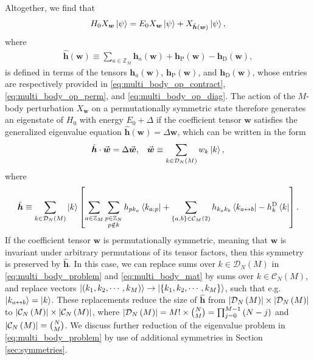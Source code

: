 \documentclass[nofootinbib,notitlepage,11pt]{revtex4-2}
\renewcommand{\t}{\text} %
\newcommand{\p}[1]{\left(#1\right)} %
\renewcommand{\sp}[1]{\left[#1\right]} %
\renewcommand{\set}[1]{\left\{#1\right\}} %
\renewcommand{\c}{\cdot} %
\newcommand{\m}{\bm} %
\renewcommand{\v}{\vec} %
\newcommand{\1}{\mathds{1}}
\newcommand{\C}{\mathcal{C}}
\newcommand{\D}{\mathcal{D}}
\newcommand{\ZZ}{\mathbb{Z}}
\newcommand{\lra}{\leftrightarrow}
\begin{document}
Altogether, we find that
\begin{align}
  H_0 X_{\m w} \ket\psi
  = E_0 X_{\m w} \ket\psi + X_{\hat{\m h}\p{\m w}} \ket\psi,
\end{align}
where
\begin{align}
  \hat{\m h}\p{\m w}
  \equiv \sum_{a\in\ZZ_M} \m h_a\p{\m w}
  + \m h_{\t{P}}\p{\m w} - \m h_{\t{D}}\p{\m w},
\end{align}
is defined in terms of the tensors $\m h_a\p{\m w}$,
$\m h_{\t{P}}\p{\m w}$, and $\m h_{\t{D}}\p{\m w}$, whose entries are
respectively provided in \eqref{eq:multi_body_op_contract},
\eqref{eq:multi_body_op_perm}, and \eqref{eq:multi_body_op_diag}.  The
action of the $M$-body perturbation $X_{\m w}$ on a permutationally
symmetric state therefore generates an eigenstate of $H_0$ with energy
$E_0+\Delta$ if the coefficient tensor $\m w$ satisfies the
generalized eigenvalue equation $\hat{\m h}\p{\m w} = \Delta \m w$,
which can be written in the form
\begin{align}
  \hat{\m h} \c \v{\m w} = \Delta \v{\m w},
  &&
  \v{\m w} \equiv \sum_{k\in\D_N\p{M}} w_k \ket{k},
  \label{eq:multi_body_problem}
\end{align}
where
\begin{align}
  \hat{\m h} \equiv \sum_{k\in\D_N\p{M}} \ket{k}
  \sp{\sum_{a\in\ZZ_M} \sum_{\substack{p\in\ZZ_N\\p\notin k}}
    h_{pk_a} \bra{k_{a:p}}
    + \sum_{\set{a,b}\in\C_M\p{2}} h_{k_ak_b} \bra{k_{a\lra b}}
    - h^{\t{D}}_k \bra{k}}.
  \label{eq:multi_body_mat}
\end{align}
If the coefficient tensor $\m w$ is permutationally symmetric, meaning
that $\m w$ is invariant under arbitrary permutations of its tensor
factors, then this symmetry is preserved by $\hat{\m h}$.  In this
case, we can replace sums over $k\in\D_N\p{M}$ in
\eqref{eq:multi_body_problem} and \eqref{eq:multi_body_mat} by sums
over $k\in\C_N\p{M}$, and replace vectors
$\ket{\p{k_1,k_2,\cdots,k_M}}\to\ket{\set{k_1,k_2,\cdots,k_M}}$, such
that e.g.~$\ket{k_{a\lra b}}=\ket{k}$.  These replacements reduce the
size of $\hat{\m h}$ from $\abs{\D_N\p{M}}\times\abs{\D_N\p{M}}$ to
$\abs{\C_N\p{M}}\times\abs{\C_N\p{M}}$, where
$\abs{\D_N\p{M}}=M!\times{N\choose M}=\prod_{j=0}^{M-1}\p{N-j}$ and
$\abs{\C_N\p{M}}={N\choose M}$.  We discuss further reduction of the
eigenvalue problem in \eqref{eq:multi_body_problem} by use of
additional symmetries in Section \ref{sec:symmetries}.
\end{document}

